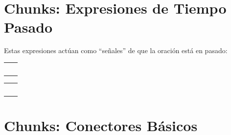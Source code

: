 \documentclass[12pt,a4paper]{article}
\begin{document}
\section{Chunks: Expresiones de Tiempo Pasado}

\begin{cajachunk}
Estas expresiones actúan como ``señales'' de que la oración está en pasado:

\medskip
\begin{multicols}{2}
\begin{tabularx}{\linewidth}{@{} X l @{}}
\eng{yesterday} & \esp{ayer} \\
\eng{last night} & \esp{anoche} \\
\eng{last week} & \esp{la semana pasada} \\
\eng{last month} & \esp{el mes pasado} \\
\eng{last year} & \esp{el año pasado} \\
\end{tabularx}

\columnbreak

\begin{tabularx}{\linewidth}{@{} X l @{}}
\eng{two days ago} & \esp{hace dos días} \\
\eng{a week ago} & \esp{hace una semana} \\
\eng{this morning} & \esp{esta mañana} \\
\eng{on Monday} & \esp{el lunes} \\
\eng{in 2020} & \esp{en 2020} \\
\end{tabularx}
\end{multicols}
\end{cajachunk}

\section{Chunks: Conectores Básicos}
\end{document}
